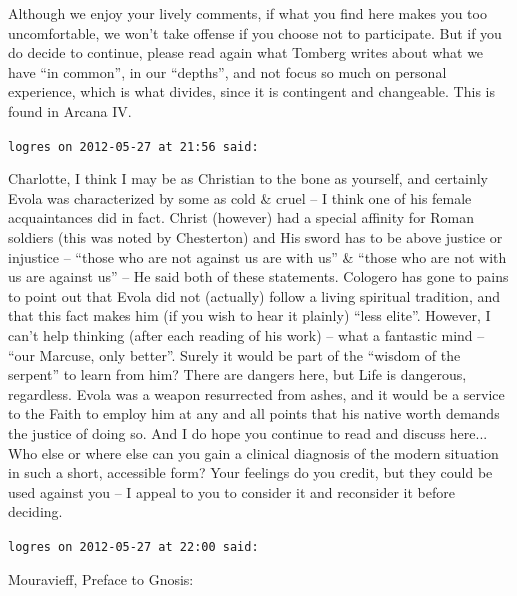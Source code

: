 \begin{footnotesize}
\begin{sffamily}
Although we enjoy your lively comments, if what you find here makes you too uncomfortable, we won't take offense if you choose not to participate. But if you do decide to continue, please read again what Tomberg writes about what we have ``in common'', in our ``depths'', and not focus so much on personal experience, which is what divides, since it is contingent and changeable. This is found in Arcana IV.

\hfill

\texttt{logres on 2012-05-27 at 21:56 said:}

Charlotte, I think I may be as Christian to the bone as yourself, and certainly Evola was characterized by some as cold \& cruel -- I think one of his female acquaintances did in fact. Christ (however) had a special affinity for Roman soldiers (this was noted by Chesterton) and His sword has to be above justice or injustice -- ``those who are not against us are with us'' \& ``those who are not with us are against us'' -- He said both of these statements. Cologero has gone to pains to point out that Evola did not (actually) follow a living spiritual tradition, and that this fact makes him (if you wish to hear it plainly) ``less elite''. However, I can't help thinking (after each reading of his work) -- what a fantastic mind -- ``our Marcuse, only better''. Surely it would be part of the ``wisdom of the serpent'' to learn from him? There are dangers here, but Life is dangerous, regardless. Evola was a weapon resurrected from ashes, and it would be a service to the Faith to employ him at any and all points that his native worth demands the justice of doing so. And I do hope you continue to read and discuss here... Who else or where else can you gain a clinical diagnosis of the modern situation in such a short, accessible form? Your feelings do you credit, but they could be used against you -- I appeal to you to consider it and reconsider it before deciding.

\hfill

\texttt{logres on 2012-05-27 at 22:00 said:}

Mouravieff, Preface to Gnosis:


\end{sffamily}
\end{footnotesize}
